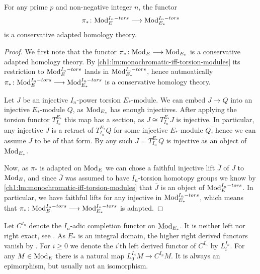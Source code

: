 \begin{lemma}
    \label{ch1:lm:conservative-adapted-torsion-modules}
    For any prime $p$ and non-negative integer $n$, the functor 
    $$\pi_*\colon \mathrm{Mod}_{E}^{I_n-tors}\longrightarrow \mathrm{Mod}_{E_*}^{I_n-tors}$$
    is a conservative adapted homology theory. 
\end{lemma}
\begin{proof}
    We first note that the functor $\pi_*\colon \mathrm{Mod}_{E}\longrightarrow \mathrm{Mod}_{E_*}$ is a conservative adapted homology theory. By \cref{ch1:lm:monochromatic-iff-torsion-modules} its restriction to $\mathrm{Mod}_{E}^{I_n-tors}$ lands in $\mathrm{Mod}_{E_*}^{I_n-tors}$, hence autmoatically $\pi_*\colon \mathrm{Mod}_{E}^{I_n-tors}\longrightarrow \mathrm{Mod}_{E_*}^{I_n-tors}$ is a conservative homology theory. 
    
    Let $J$ be an injective $I_n$-power torsion $E_*$-module. We can embed $J\longrightarrow Q$ into an injective $E_*$-module $Q$, as $\mathrm{Mod}_{E_*}$ has enough injectives. After applying the torsion functor $T^{E_*}_{I_n}$ this map has a section, as $J \cong T^{E_*}_{I_n}J$ is injective. In particular, any injective $J$ is a retract of $T^{E_*}_{I_n}Q$ for some injective $E_*$-module $Q$, hence we can assume $J$ to be of that form. By \cite[2.1.4]{brodmann-sharp_1998} any such $J = T^{E_*}_{I_n}Q$ is injective as an object of $\mathrm{Mod}_{E_*}$. 
    
    Now, as $\pi_*$ is adapted on $\mathrm{Mod}_{E}$ we can chose a faithful injective lift $\bar{J}$ of $J$ to $\mathrm{Mod}_{E}$, and since $\bar{J}$ was assumed to have $I_n$-torsion homotopy groups we know by \cref{ch1:lm:monochromatic-iff-torsion-modules} that $\bar{J}$ is an object of $\mathrm{Mod}_{E}^{I_n-tors}$. In particular, we have faithful lifts for any injective in $\mathrm{Mod}_{E_*}^{I_n-tors}$, which means that $\pi_*\colon \mathrm{Mod}_{E}^{I_n-tors}\longrightarrow \mathrm{Mod}_{E_*}^{I_n-tors}$ is adapted. 
\end{proof}

Let $C^{I_n}$ denote the $I_n$-adic completion functor on $\mathrm{Mod}_{E_*}$. It is neither left nor right exact, see \cite[Appendix A.]{hovey-strickland_99}. As $E_*$ is an integral domain, the higher right derived functors vanish by \cite[5.1]{greenlees-may_92}. For $i\geq 0$ we denote the $i$'th left derived functor of $C^{I_n}$ by $L^{I_n}_i$. For any $M\in \mathrm{Mod}_{E}$ there is a natural map $L^{I_n}_0 M \longrightarrow C^{I_n}M$. It is always an epimorphism, but usually not an isomorphism. 

